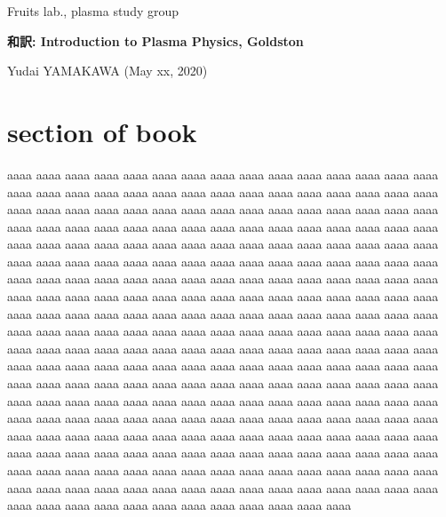 \documentclass[a4j,10pt,dvipdfmx]{jsarticle}
\begin{document}
%
%
%
\noindent
{\footnotesize
Fruits lab., plasma study group
}

\noindent
	\textbf{\Large
		和訳: Introduction to Plasma Physics, Goldston
	}

	\vspace{1ex}

\noindent
	\textrm{\small 
		Yudai YAMAKAWA (May xx, 2020)
	}



\vspace{4ex}


\section{section of book}
%
aaaa aaaa aaaa aaaa aaaa aaaa aaaa aaaa aaaa aaaa aaaa 
aaaa aaaa aaaa aaaa aaaa aaaa aaaa aaaa aaaa aaaa aaaa 
aaaa aaaa aaaa aaaa aaaa aaaa aaaa aaaa aaaa aaaa aaaa 
aaaa aaaa aaaa aaaa aaaa aaaa aaaa aaaa aaaa aaaa aaaa 
aaaa aaaa aaaa aaaa aaaa aaaa aaaa aaaa aaaa aaaa aaaa 
aaaa aaaa aaaa aaaa aaaa aaaa aaaa aaaa aaaa aaaa aaaa 
aaaa aaaa aaaa aaaa aaaa aaaa aaaa aaaa aaaa aaaa aaaa 
aaaa aaaa aaaa aaaa aaaa aaaa aaaa aaaa aaaa aaaa aaaa 
aaaa aaaa aaaa aaaa aaaa aaaa aaaa aaaa aaaa aaaa aaaa 
aaaa aaaa aaaa aaaa aaaa aaaa aaaa aaaa aaaa aaaa aaaa 
aaaa aaaa aaaa aaaa aaaa aaaa aaaa aaaa aaaa aaaa aaaa 
aaaa aaaa aaaa aaaa aaaa aaaa aaaa aaaa aaaa aaaa aaaa 
aaaa aaaa aaaa aaaa aaaa aaaa aaaa aaaa aaaa aaaa aaaa 
aaaa aaaa aaaa aaaa aaaa aaaa aaaa aaaa aaaa aaaa aaaa 
aaaa aaaa aaaa aaaa aaaa aaaa aaaa aaaa aaaa aaaa aaaa 
aaaa aaaa aaaa aaaa aaaa aaaa aaaa aaaa aaaa aaaa aaaa 
aaaa aaaa aaaa aaaa aaaa aaaa aaaa aaaa aaaa aaaa aaaa 
aaaa aaaa aaaa aaaa aaaa aaaa aaaa aaaa aaaa aaaa aaaa 
aaaa aaaa aaaa aaaa aaaa aaaa aaaa aaaa aaaa aaaa aaaa 
aaaa aaaa aaaa aaaa aaaa aaaa aaaa aaaa aaaa aaaa aaaa 
aaaa aaaa aaaa aaaa aaaa aaaa aaaa aaaa aaaa aaaa aaaa 
aaaa aaaa aaaa aaaa aaaa aaaa aaaa aaaa aaaa aaaa aaaa 
aaaa aaaa aaaa aaaa aaaa aaaa aaaa aaaa aaaa aaaa aaaa 
aaaa aaaa aaaa aaaa aaaa aaaa aaaa aaaa aaaa aaaa aaaa 
aaaa aaaa aaaa aaaa aaaa aaaa aaaa aaaa aaaa aaaa aaaa 
aaaa aaaa aaaa aaaa aaaa aaaa aaaa aaaa aaaa aaaa aaaa 
aaaa aaaa aaaa aaaa aaaa aaaa aaaa aaaa aaaa aaaa aaaa 
\end{document}
